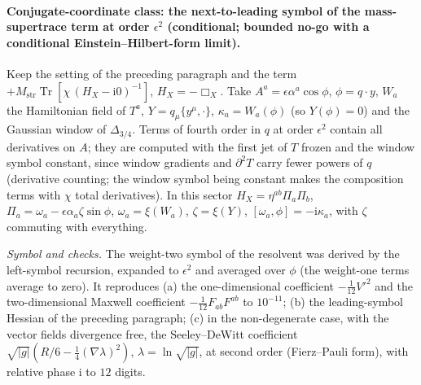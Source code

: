 \paragraph{Conjugate-coordinate class: the next-to-leading symbol of the mass-supertrace term at order \(\epsilon^2\) (conditional; bounded no-go with a conditional Einstein--Hilbert-form limit).}
Keep the setting of the preceding paragraph and the term \(+M_{\mathrm{str}}\operatorname{Tr}[\chi\,(H_X-\mathrm i0)^{-1}]\), \(H_X=-\Box_X\). Take \(A^a=\epsilon\alpha^a\cos\phi\), \(\phi=q\cdot y\), \(W_a\) the Hamiltonian field of \(T^a\), \(Y=q_\mu\{y^\mu,\cdot\}\), \(\kappa_a=W_a(\phi)\) (so \(Y(\phi)=0\)) and the Gaussian window of \(\Delta_{3/4}\). Terms of fourth order in \(q\) at order \(\epsilon^2\) contain all derivatives on \(A\); they are computed with the first jet of \(T\) frozen and the window symbol constant, since window gradients and \(\partial^2T\) carry fewer powers of \(q\) (derivative counting; the window symbol being constant makes the composition terms with \(\chi\) total derivatives). In this sector \(H_X=\eta^{ab}\Pi_a\Pi_b\), \(\Pi_a=\omega_a-\epsilon\alpha_a\zeta\sin\phi\), \(\omega_a=\xi(W_a)\), \(\zeta=\xi(Y)\), \([\omega_a,\phi]=-\mathrm i\kappa_a\), with \(\zeta\) commuting with everything.

\emph{Symbol and checks.} The weight-two symbol of the resolvent was derived by the left-symbol recursion, expanded to \(\epsilon^2\) and averaged over \(\phi\) (the weight-one terms average to zero). It reproduces (a) the one-dimensional coefficient \(-\tfrac1{12}V'^2\) and the two-dimensional Maxwell coefficient \(-\tfrac1{12}F_{ab}F^{ab}\) to \(10^{-11}\); (b) the leading-symbol Hessian of the preceding paragraph; (c) in the non-degenerate case, with the vector fields divergence free, the Seeley--DeWitt coefficient \(\sqrt{|g|}(R/6-\tfrac14(\nabla\lambda)^2)\), \(\lambda=\ln\sqrt{|g|}\), at second order (Fierz--Pauli form), with relative phase \(\mathrm i\) to \(12\) digits.

